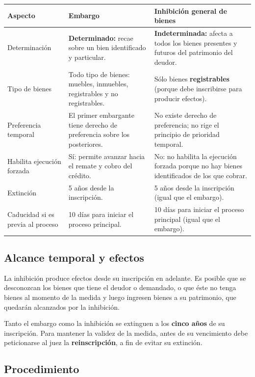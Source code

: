 \documentclass[12pt,oneside]{book}
\renewcommand{\arraystretch}{1.15}
\begin{document}
\medskip
\renewcommand{\arraystretch}{1.3}
\noindent\begin{tabularx}{\textwidth}{@{}>{\raggedright\arraybackslash}p{2.8cm} Y Y@{}}
\toprule
\textbf{Aspecto} & \textbf{Embargo} & \textbf{Inhibición general de bienes} \\
\midrule
Determinación &
\textbf{Determinado:} recae sobre un bien identificado y particular. &
\textbf{Indeterminada:} afecta a todos los bienes presentes y futuros del patrimonio del deudor. \\
\addlinespace
Tipo de bienes &
Todo tipo de bienes: muebles, inmuebles, registrables y no registrables. &
Sólo bienes \textbf{registrables} (porque debe inscribirse para producir efectos). \\
\addlinespace
Preferencia temporal &
El primer embargante tiene derecho de preferencia sobre los posteriores. &
No existe derecho de preferencia; no rige el principio de prioridad temporal. \\
\addlinespace
Habilita ejecución forzada &
Sí: permite avanzar hacia el remate y cobro del crédito. &
No: no habilita la ejecución forzada porque no hay bienes identificados de los que cobrar. \\
\addlinespace
Extinción &
5 años desde la inscripción. &
5 años desde la inscripción (igual que el embargo). \\
\addlinespace
Caducidad si es previa al proceso &
10 días para iniciar el proceso principal. &
10 días para iniciar el proceso principal (igual que el embargo). \\
\bottomrule
\end{tabularx}
\renewcommand{\arraystretch}{1}

\subsection{Alcance temporal y efectos}

La inhibición produce efectos desde su inscripción en adelante. Es posible que se desconozcan los bienes que tiene el deudor o demandado, o que éste no tenga bienes al momento de la medida y luego ingresen bienes a su patrimonio, que quedarán alcanzados por la inhibición.

Tanto el embargo como la inhibición se extinguen a los \textbf{cinco años} de su inscripción. Para mantener la validez de la medida, antes de su vencimiento debe peticionarse al juez la \textbf{reinscripción}, a fin de evitar su extinción.

\subsection{Procedimiento}
\end{document}
